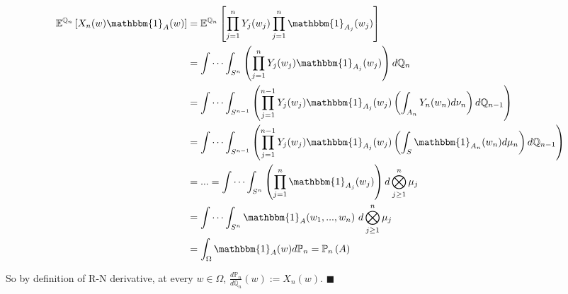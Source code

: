 \documentclass[a4paper,12pt,twoside]{book}
\begin{document}
\begin{itemize}
\begin{itemize}
	\begin{equation}
		\begin{split}
			\mathbb{E}^{\mathbb{Q}_n}\left[X_n(w) \mathbbm{1}_{A}(w)\right]&=
			\mathbb{E}^{\mathbb{Q}_n}\left[\prod_{j=1}^n Y_j (w_j) \prod_{j=1}^n \mathbbm{1}_{A_j}(w_j)\right]\\
			&=\idotsint_{S^n} \left(\prod_{j=1}^n Y_j (w_j) \mathbbm{1}_{A_j}(w_j)\right) d\mathbb{Q}_{n}\\
			&= \idotsint_{S^{n-1}} \left(\prod_{j=1}^{n-1} Y_j (w_j) \mathbbm{1}_{A_j}(w_j) \left(\int_{A_n}Y_n(w_n) d\nu_n\right) d\mathbb{Q}_{n-1} \right)\\
			&= \idotsint_{S^{n-1}} \left(\prod_{j=1}^{n-1} Y_j (w_j) \mathbbm{1}_{A_j}(w_j) \left(\int_{S}\mathbbm{1}_{A_n}(w_n) d\mu_n\right) d\mathbb{Q}_{n-1} \right)  \\
			&= ... = \idotsint_{S^n} \left(\prod_{j=1}^{n} \mathbbm{1}_{A_j}(w_j) \right) d \bigotimes_{j\geq 1}^{n} \mu_j\\
			&= \idotsint_{S^n} \mathbbm{1}_{A}(w_1, ..., w_n)~d \bigotimes_{j\geq 1}^{n} \mu_j\\
			&=\int_{\Omega}\mathbbm{1}_{A}(w) d\mathbb{P}_n = \mathbb{P}_n\left(A\right)
		\end{split}
	\end{equation}

	So by definition of R-N derivative, at every $w\in \Omega$, $\frac{d\mathbb{P}_n}{d\mathbb{Q}_n}(w):= X_n(w)$. $\blacksquare$
	\newline


\end{itemize}
\end{itemize}
\end{document}
